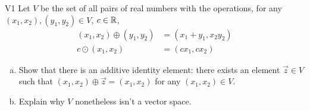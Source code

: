  \begin{problem}{V1}
 Let \(V\) be the set of all pairs of real numbers with the operations, for any \((x_1,x_2), (y_1,y_2) \in V\), \(c\in \mathbb{R}\),
 \begin{align*}
 (x_1,x_2) \oplus (y_1,y_2) &= (x_1+y_1,x_2y_2) \\
 c \odot (x_1,x_2) &= (cx_1, cx_2)
 \end{align*}
 \begin{enumerate}[(a)]
 \item Show that there is an additive identity element:
       there exists an element \(\vec{z} \in V\) such that \((x_1,x_2)\oplus\vec{z}= (x_1,x_2)\) for any \( (x_1,x_2) \in V\).
\item Explain why \(V\) nonetheless isn't a vector space.
 \end{enumerate}
\end{problem}
